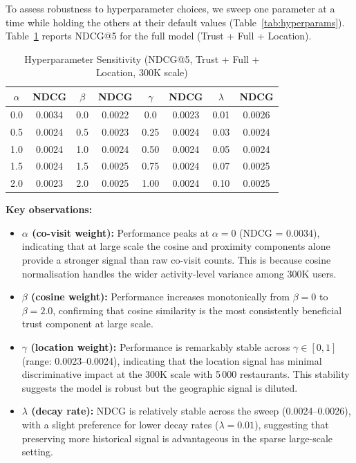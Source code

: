 \documentclass[conference]{IEEEtran}
\begin{document}
To assess robustness to hyperparameter choices, we sweep one parameter at
a time while holding the others at their default values
(Table~\ref{tab:hyperparams}).  Table~\ref{tab:sensitivity} reports
NDCG@5 for the full model (Trust + Full + Location).

\begin{table}[h]
\centering
\caption{Hyperparameter Sensitivity (NDCG@5, Trust + Full + Location, 300K scale)}
\label{tab:sensitivity}
\begin{tabular}{cc|cc|cc|cc}
\toprule
$\alpha$ & NDCG & $\beta$ & NDCG & $\gamma$ & NDCG & $\lambda$ & NDCG \\
\midrule
0.0  & 0.0034 & 0.0  & 0.0022 & 0.0  & 0.0023 & 0.01 & 0.0026 \\
0.5  & 0.0024 & 0.5  & 0.0023 & 0.25 & 0.0024 & 0.03 & 0.0024 \\
1.0  & 0.0024 & 1.0  & 0.0024 & 0.50 & 0.0024 & 0.05 & 0.0024 \\
1.5  & 0.0024 & 1.5  & 0.0025 & 0.75 & 0.0024 & 0.07 & 0.0025 \\
2.0  & 0.0023 & 2.0  & 0.0025 & 1.00 & 0.0024 & 0.10 & 0.0025 \\
\bottomrule
\end{tabular}
\end{table}

\textbf{Key observations:}

\begin{itemize}
  \item \textbf{$\alpha$ (co-visit weight):}  Performance peaks at
        $\alpha = 0$ (NDCG = 0.0034), indicating that at large scale the
        cosine and proximity components alone provide a stronger signal
        than raw co-visit counts.  This is because cosine normalisation
        handles the wider activity-level variance among 300K users.

  \item \textbf{$\beta$ (cosine weight):}  Performance increases
        monotonically from $\beta = 0$ to $\beta = 2.0$, confirming
        that cosine similarity is the most consistently beneficial
        trust component at large scale.

  \item \textbf{$\gamma$ (location weight):}  Performance is remarkably
        stable across $\gamma \in [0, 1]$ (range: 0.0023--0.0024),
        indicating that the location signal has minimal discriminative
        impact at the 300K scale with 5\,000 restaurants.  This stability
        suggests the model is robust but the geographic signal is
        diluted.

  \item \textbf{$\lambda$ (decay rate):}  NDCG is relatively stable
        across the sweep (0.0024--0.0026), with a slight preference for
        lower decay rates ($\lambda = 0.01$), suggesting that preserving
        more historical signal is advantageous in the sparse large-scale
        setting.
\end{itemize}
\end{document}
